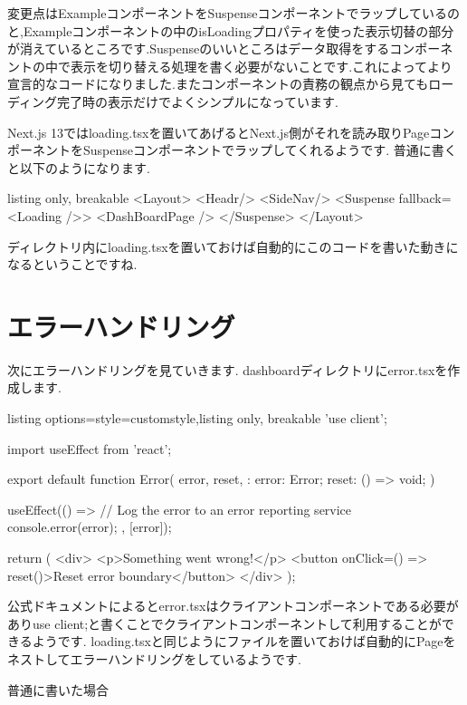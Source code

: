 変更点はExampleコンポーネントをSuspenseコンポーネントでラップしているのと,Exampleコンポーネントの中のisLoadingプロパティを使った表示切替の部分が消えているところです.Suspenseのいいところはデータ取得をするコンポーネントの中で表示を切り替える処理を書く必要がないことです.これによってより宣言的なコードになりました.またコンポーネントの責務の観点から見てもローディング完了時の表示だけでよくシンプルになっています.

Next.js 13ではloading.tsxを置いてあげるとNext.js側がそれを読み取りPageコンポーネントをSuspenseコンポーネントでラップしてくれるようです.
普通に書くと以下のようになります.



\begin{tcblisting}{listing only, breakable}
  <Layout>
  <Headr/>
  <SideNav/>
  <Suspense fallback={<Loading />}>
  <DashBoardPage />
  </Suspense>
  </Layout>
\end{tcblisting}


ディレクトリ内にloading.tsxを置いておけば自動的にこのコードを書いた動きになるということですね.


\section{エラーハンドリング}

次にエラーハンドリングを見ていきます.
dashboardディレクトリにerror.tsxを作成します.


\begin{tcblisting}{listing options={style=customstyle},listing only, breakable}
  'use client';

  import { useEffect } from 'react';

  export default function Error({
      error,
      reset,
    }: {
  error: Error;
  reset: () => void;
  }) {
  useEffect(() => {
  // Log the error to an error reporting service
  console.error(error);
  }, [error]);

  return (
  <div>
  <p>Something went wrong!</p>
  <button onClick={() => reset()}>Reset error boundary</button>
  </div>
  );
  }
\end{tcblisting}



公式ドキュメントによるとerror.tsxはクライアントコンポーネントである必要がありuse client;と書くことでクライアントコンポーネントして利用することができるようです.
loading.tsxと同じようにファイルを置いておけば自動的にPageをネストしてエラーハンドリングをしているようです.

普通に書いた場合




